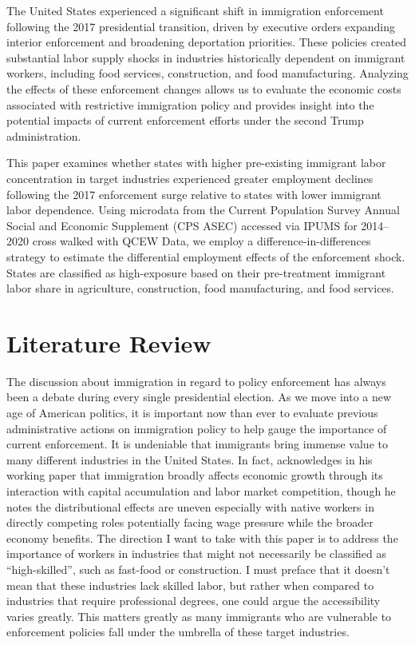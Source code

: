 \documentclass[12pt]{article}
\begin{document}
 
The United States experienced a significant shift in immigration enforcement following the 2017 presidential transition, driven by executive orders expanding interior enforcement and broadening deportation priorities. These policies created substantial labor supply shocks in industries historically dependent on immigrant workers, including food services, construction, and food manufacturing. Analyzing the effects of these enforcement changes allows us to evaluate the economic costs associated with restrictive immigration policy and provides insight into the potential impacts of current enforcement efforts under the second Trump administration.

This paper examines whether states with higher pre-existing immigrant labor concentration in target industries experienced greater employment declines following the 2017 enforcement surge relative to states with lower immigrant labor dependence. Using microdata from the Current Population Survey Annual Social and Economic Supplement (CPS ASEC) accessed via IPUMS for 2014–2020 cross walked with QCEW Data, we employ a difference-in-differences strategy to estimate the differential employment effects of the enforcement shock. States are classified as high-exposure based on their pre-treatment immigrant labor share in agriculture, construction, food manufacturing, and food services.
 
\section{Literature Review}

The discussion about immigration in regard to policy enforcement has always been a debate during every single presidential election. As we move into a new age of American politics, it is important now than ever to evaluate previous administrative actions on immigration policy to help gauge the importance of current enforcement. It is undeniable that immigrants bring immense value to many different industries in the United States. In fact, \citet{borjas2019} acknowledges in his working paper that immigration broadly affects economic growth through its interaction with capital accumulation and labor market competition, though he notes the distributional effects are uneven especially with native workers in directly competing roles potentially facing wage pressure while the broader economy benefits. The direction I want to take with this paper is to address the importance of workers in industries that might not necessarily be classified as ``high-skilled'', such as fast-food or construction. I must preface that it doesn't mean that these industries lack skilled labor, but rather when compared to industries that require professional degrees, one could argue the accessibility varies greatly. This matters greatly as many immigrants who are vulnerable to enforcement policies fall under the umbrella of these target industries.
\end{document}
